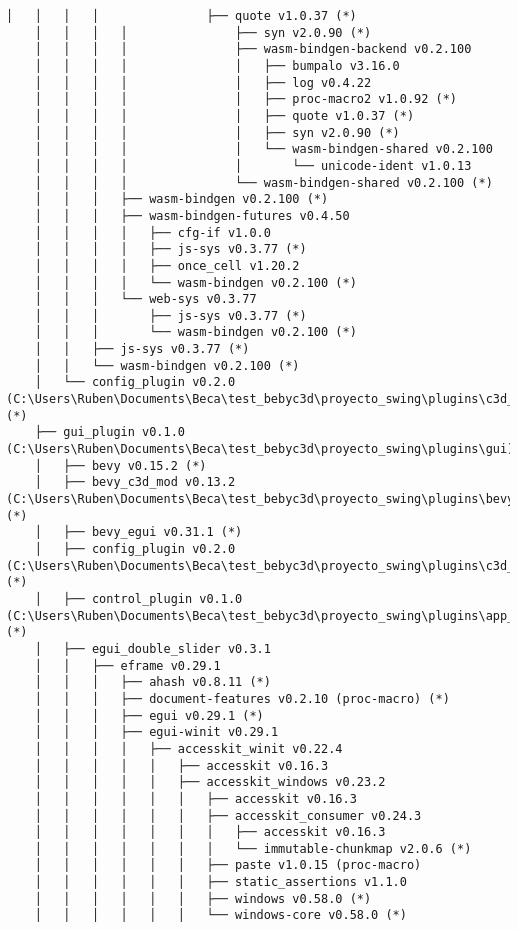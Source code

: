\begin{lstlisting}[style=mystyle, caption={dependencias del proyecto}, label={lst:dependencias}]
    │   │   │   │               ├── quote v1.0.37 (*)
    │   │   │   │               ├── syn v2.0.90 (*)
    │   │   │   │               ├── wasm-bindgen-backend v0.2.100
    │   │   │   │               │   ├── bumpalo v3.16.0
    │   │   │   │               │   ├── log v0.4.22
    │   │   │   │               │   ├── proc-macro2 v1.0.92 (*)
    │   │   │   │               │   ├── quote v1.0.37 (*)
    │   │   │   │               │   ├── syn v2.0.90 (*)
    │   │   │   │               │   └── wasm-bindgen-shared v0.2.100
    │   │   │   │               │       └── unicode-ident v1.0.13
    │   │   │   │               └── wasm-bindgen-shared v0.2.100 (*)
    │   │   │   ├── wasm-bindgen v0.2.100 (*)
    │   │   │   ├── wasm-bindgen-futures v0.4.50
    │   │   │   │   ├── cfg-if v1.0.0
    │   │   │   │   ├── js-sys v0.3.77 (*)
    │   │   │   │   ├── once_cell v1.20.2
    │   │   │   │   └── wasm-bindgen v0.2.100 (*)
    │   │   │   └── web-sys v0.3.77
    │   │   │       ├── js-sys v0.3.77 (*)
    │   │   │       └── wasm-bindgen v0.2.100 (*)
    │   │   ├── js-sys v0.3.77 (*)
    │   │   └── wasm-bindgen v0.2.100 (*)
    │   └── config_plugin v0.2.0 (C:\Users\Ruben\Documents\Beca\test_bebyc3d\proyecto_swing\plugins\c3d_config) (*)
    ├── gui_plugin v0.1.0 (C:\Users\Ruben\Documents\Beca\test_bebyc3d\proyecto_swing\plugins\gui)
    │   ├── bevy v0.15.2 (*)
    │   ├── bevy_c3d_mod v0.13.2 (C:\Users\Ruben\Documents\Beca\test_bebyc3d\proyecto_swing\plugins\bevy_c3d_mod) (*)
    │   ├── bevy_egui v0.31.1 (*)
    │   ├── config_plugin v0.2.0 (C:\Users\Ruben\Documents\Beca\test_bebyc3d\proyecto_swing\plugins\c3d_config) (*)
    │   ├── control_plugin v0.1.0 (C:\Users\Ruben\Documents\Beca\test_bebyc3d\proyecto_swing\plugins\app_control) (*)
    │   ├── egui_double_slider v0.3.1
    │   │   ├── eframe v0.29.1
    │   │   │   ├── ahash v0.8.11 (*)
    │   │   │   ├── document-features v0.2.10 (proc-macro) (*)
    │   │   │   ├── egui v0.29.1 (*)
    │   │   │   ├── egui-winit v0.29.1
    │   │   │   │   ├── accesskit_winit v0.22.4
    │   │   │   │   │   ├── accesskit v0.16.3
    │   │   │   │   │   ├── accesskit_windows v0.23.2
    │   │   │   │   │   │   ├── accesskit v0.16.3
    │   │   │   │   │   │   ├── accesskit_consumer v0.24.3
    │   │   │   │   │   │   │   ├── accesskit v0.16.3
    │   │   │   │   │   │   │   └── immutable-chunkmap v2.0.6 (*)
    │   │   │   │   │   │   ├── paste v1.0.15 (proc-macro)
    │   │   │   │   │   │   ├── static_assertions v1.1.0
    │   │   │   │   │   │   ├── windows v0.58.0 (*)
    │   │   │   │   │   │   └── windows-core v0.58.0 (*)

\end{lstlisting}

